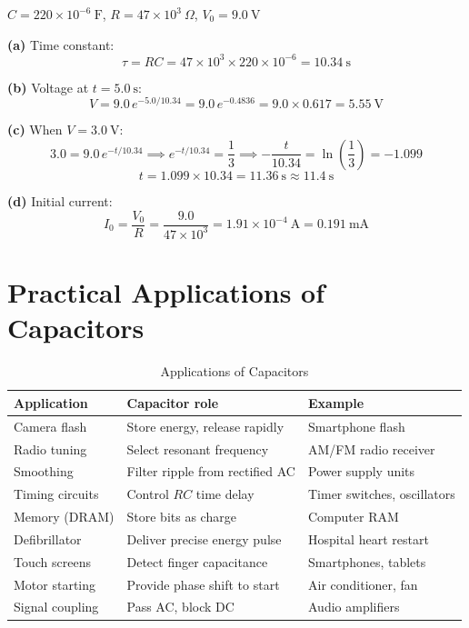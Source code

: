 \begin{solutionbox}
$C = 220\times10^{-6}\ \text{F}$,
$R = 47\times10^3\ \Omega$,
$V_0 = 9.0\ \text{V}$

\textbf{(a)} Time constant:
\[
  \tau = RC = 47\times10^3
  \times 220\times10^{-6}
  = 10.34\ \text{s}
\]

\textbf{(b)} Voltage at $t = 5.0\ \text{s}$:
\[
  V = 9.0\,e^{-5.0/10.34}
  = 9.0\,e^{-0.4836}
  = 9.0 \times 0.617
  = 5.55\ \text{V}
\]

\textbf{(c)} When $V = 3.0\ \text{V}$:
\[
  3.0 = 9.0\,e^{-t/10.34}
  \implies e^{-t/10.34} = \frac{1}{3}
  \implies -\frac{t}{10.34} = \ln\!\left(\frac{1}{3}\right)
  = -1.099
\]
\[
  t = 1.099 \times 10.34 = 11.36\ \text{s}
  \approx 11.4\ \text{s}
\]

\textbf{(d)} Initial current:
\[
  I_0 = \frac{V_0}{R}
  = \frac{9.0}{47\times10^3}
  = 1.91\times10^{-4}\ \text{A}
  = 0.191\ \text{mA}
\]
\end{solutionbox}

\section{Practical Applications of Capacitors}

\begin{table}[H]
\centering
\caption{Applications of Capacitors}
\label{tab:capacitor_apps}
\begin{tabular}{lll}
\toprule
\textbf{Application} & \textbf{Capacitor role} &
\textbf{Example}\\
\midrule
Camera flash & Store energy, release rapidly &
  Smartphone flash\\
Radio tuning & Select resonant frequency &
  AM/FM radio receiver\\
Smoothing & Filter ripple from rectified AC &
  Power supply units\\
Timing circuits & Control $RC$ time delay &
  Timer switches, oscillators\\
Memory (DRAM) & Store bits as charge &
  Computer RAM\\
Defibrillator & Deliver precise energy pulse &
  Hospital heart restart\\
Touch screens & Detect finger capacitance &
  Smartphones, tablets\\
Motor starting & Provide phase shift to start &
  Air conditioner, fan\\
Signal coupling & Pass AC, block DC &
  Audio amplifiers\\
\bottomrule
\end{tabular}
\end{table}

